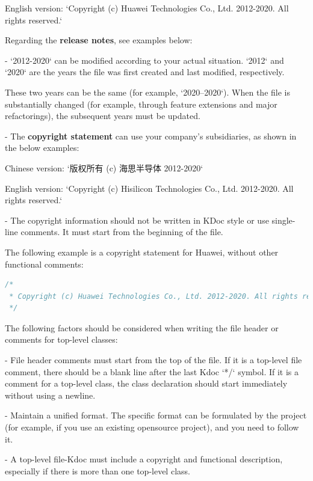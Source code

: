 English version: `Copyright (c) Huawei Technologies Co., Ltd. 2012-2020. All rights reserved.`



Regarding the \textbf{release notes}, see examples below:



- `2012-2020` can be modified according to your actual situation. `2012` and `2020` are the years the file was first created and last modified, respectively.

These two years can be the same (for example, `2020–2020`). When the file is substantially changed (for example, through feature extensions and major refactorings), the subsequent years must be updated.



- The \textbf{copyright statement} can use your company's subsidiaries, as shown in the below examples: \

Chinese version: `版权所有 (c) 海思半导体 2012-2020` \

English version: `Copyright (c) Hisilicon Technologies Co., Ltd. 2012-2020. All rights reserved.` 



- The copyright information should not be written in KDoc style or use single-line comments. It must start from the beginning of the file.

The following example is a copyright statement for Huawei, without other functional comments:



\begin{lstlisting}[language=Kotlin]
/*
 * Copyright (c) Huawei Technologies Co., Ltd. 2012-2020. All rights reserved.
 */
\end{lstlisting}


The following factors should be considered when writing the file header or comments for top-level classes:

- File header comments must start from the top of the file. If it is a top-level file comment, there should be a blank line after the last Kdoc `*/` symbol. If it is a comment for a top-level class, the class declaration should start immediately without using a newline.

- Maintain a unified format. The specific format can be formulated by the project (for example, if you use an existing opensource project), and you need to follow it.

- A top-level file-Kdoc must include a copyright and functional description, especially if there is more than one top-level class.

